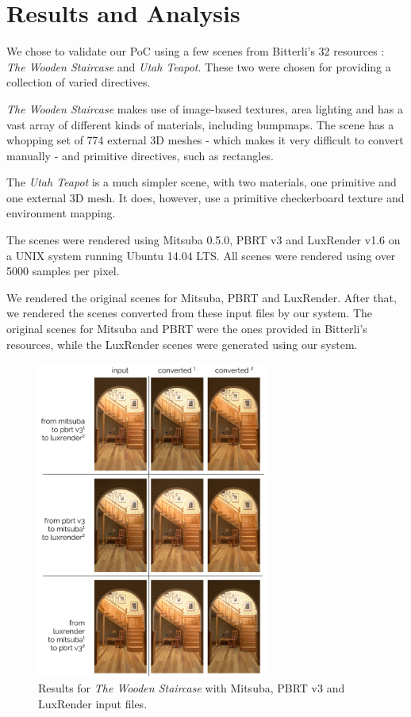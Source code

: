 \section{Results and Analysis}
We chose to validate our PoC using a few scenes from Bitterli's 32 resources 
\cite{resources16}: \textit{The Wooden Staircase} and \textit{Utah Teapot}. 
These two were chosen for providing a collection of varied directives.

\textit{The Wooden Staircase} makes use of image-based textures, area lighting 
and has a vast array of different kinds of materials, including bumpmaps. The 
scene has a whopping set of 774 external 3D meshes - which makes it very 
difficult to convert manually - and primitive directives, such as rectangles.

The \textit{Utah Teapot} is a much simpler scene, with two materials, one primitive  and one 
external 3D mesh. It does, however, use a primitive checkerboard texture and 
environment mapping.

The scenes were rendered using Mitsuba 0.5.0, PBRT v3 and LuxRender v1.6 on a 
UNIX system running Ubuntu 14.04 LTS. All scenes were rendered using over 5000 
samples per pixel. 

We rendered the original scenes for Mitsuba, PBRT and LuxRender. After that, we 
rendered the scenes converted from these input files by our system. The original 
scenes for Mitsuba and PBRT were the ones provided in Bitterli's resources, 
while the LuxRender scenes were generated using our system.

\begin{figure}[h]
\centering
\includegraphics[width=3in]{figs/4_results/results_staircase.png}
\caption{Results for \textit{The Wooden Staircase} with Mitsuba, PBRT v3 and 
LuxRender input files.}
\label{fig:staircase}
\end{figure}

